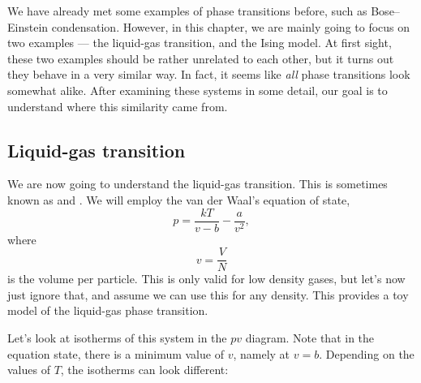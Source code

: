 \documentclass[a4paper]{article}
\begin{document}
We have already met some examples of phase transitions before, such as Bose--Einstein condensation. However, in this chapter, we are mainly going to focus on two examples --- the liquid-gas transition, and the Ising model. At first sight, these two examples should be rather unrelated to each other, but it turns out they behave in a very similar way. In fact, it seems like \emph{all} phase transitions look somewhat alike. After examining these systems in some detail, our goal is to understand where this similarity came from.

\subsection{Liquid-gas transition}
We are now going to understand the liquid-gas transition. This is sometimes known as  and . We will employ the van der Waal's equation of state,
\[
  p = \frac{kT}{v - b} - \frac{a}{v^2},
\]
where
\[
  v = \frac{V}{N}
\]
is the volume per particle. This is only valid for low density gases, but let's now just ignore that, and assume we can use this for any density. This provides a toy model of the liquid-gas phase transition.

Let's look at isotherms of this system in the $pv$ diagram. Note that in the equation state, there is a minimum value of $v$, namely at $v = b$. Depending on the values of $T$, the isotherms can look different:
\end{document}
